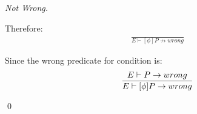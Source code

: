 \begin{proof}[Not Wrong]
\begin{description}
		Therefore:
		\begin{align*}
		\frac{}{E \vdash [\phi ]P \nrightarrow wrong}
		\end{align*}
		
		Since the wrong predicate for condition is:
		\begin{align*}
		\frac{E \vdash P \rightarrow wrong}{E \vdash [\phi ]P \rightarrow wrong}
		\end{align*}
	\end{description}
	\qed
\end{proof}
